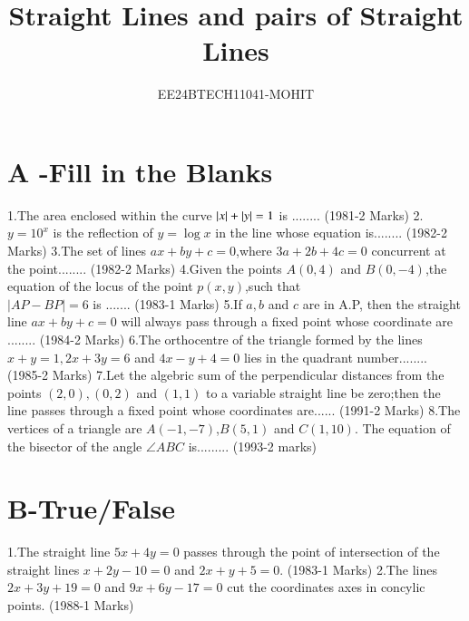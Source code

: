 \documentclass[journal,12pt,twocolumn]{IEEEtran}
\theoremstyle{remark}
\begin{document}

\vspace{3cm}

\title{Straight Lines and pairs of Straight Lines}
\author{EE24BTECH11041-MOHIT}
\maketitle
\newpage
\bigskip

\renewcommand{\thefigure}{\theenumi}
\renewcommand{\thetable}{\theenumi}

\section {A -Fill in the Blanks}
1.The area enclosed within the curve $\left\vert x\right\vert+\left\vert y\right\vert=1$ is ........
\hfill(1981-2 Marks)
2.$y = 10^x $ is the reflection of $y=\log x$ in the  line whose equation is........
\hfill(1982-2 Marks)
3.The set of lines $ax+by+c=0$,where $3a+2b+4c=0$ concurrent at the point........
\hfill(1982-2 Marks)
4.Given the points $A(0,4)$ and $B(0,-4)$,the equation of the locus of the point $p(x,y)$,such that \\
    $|AP-BP|=6$ is .......
\hfill(1983-1 Marks)
5.If $a,b$ and $c$ are in A.P, then the straight line $ax +by +c=0$ will always pass through a fixed point whose coordinate are ........
\hfill(1984-2 Marks)
6.The orthocentre of the triangle formed by the lines $x+y=1,2x +3y=6$ and $4x-y+4=0$ lies in the quadrant number........
\hfill(1985-2 Marks)
7.Let the algebric sum of the perpendicular distances from the points $(2,0),(0,2)$ and $(1,1)$ to a variable straight line be zero;then the line passes through a fixed point whose coordinates are......
\hfill(1991-2 Marks)
8.The vertices of a triangle are $A(-1,-7)$,$B(5,1)$ and $C(1,10)$. The equation of the bisector of the angle $\angle{ABC}$ is.........
\hfill(1993-2 marks)
\section {B-True/False}
1.The straight line $5x+4y=0$ passes through the point of intersection of the straight lines $x+2y-10=0$ and $2x+y+5=0$.
\hfill(1983-1 Marks)
2.The lines $2x+3y+19=0$ and $9x+6y-17=0$ cut the coordinates axes in concylic points.
\hfill(1988-1 Marks)
\end{document}
